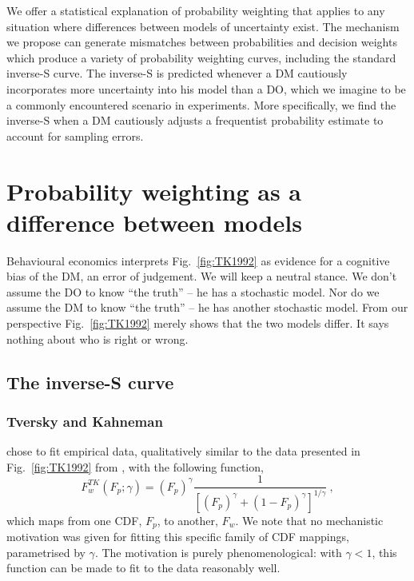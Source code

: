 \documentclass[a4paper, 12pt]{article}
\newcommand{\elabel}[1]{\label{eq:#1}}
\newcommand{\eref}[1]{(Eq.~\ref{eq:#1})}
\newcommand{\fref}[1]{Fig.~\ref{fig:#1}}
\newcommand{\seclabel}[1]{\label{sec:#1}}
\newcommand{\be}{\begin{equation}}
\newcommand{\ee}{\end{equation}}
\newcommand{\MK}[1]{\textcolor{red}{\textit{***MK: #1 MK***}}}
\begin{document}
We offer a statistical explanation of probability weighting that applies to any situation where differences between models of uncertainty exist.
The mechanism we propose can generate mismatches between probabilities and decision weights which produce a variety of probability weighting curves, including the standard inverse-S curve.
The inverse-S is predicted whenever a DM cautiously incorporates more uncertainty into his model than a DO, which we imagine to be a commonly encountered scenario in experiments.
More specifically, we find the inverse-S when a DM cautiously adjusts a frequentist probability estimate to account for sampling errors.
%
% 
%



\section{Probability weighting as a difference between models} \seclabel{ModelDiff}
Behavioural economics interprets \fref{TK1992} as evidence for a cognitive bias of the DM, an error of judgement. We will keep a neutral stance. We don't assume the DO to know ``the truth'' -- he has a stochastic model. Nor do we assume the DM to know ``the truth'' -- he has another stochastic model. From our perspective \fref{TK1992} merely shows that the two models differ. It says nothing about who is right or wrong.

\subsection{The inverse-S curve\seclabel{The_inverse}}
\subsubsection{Tversky and Kahneman}
\textcite{TverskyKahneman1992} chose to fit empirical data, qualitatively similar to the data presented in \fref{TK1992} from \textcite{PrestonBaratta1948}, with the following function,
%
\be
\elabel{correspondence}
F^{TK}_w\left(F_p; \gamma\right) = \left(F_p\right)^\gamma \frac{1}{\left[\left(F_p\right)^\gamma+\left(1-F_p\right)^\gamma\right]^{1/\gamma}} ~,
\ee
%
which maps from one CDF, $F_p$, to another, $F_w$. We note that no mechanistic motivation was given for fitting this specific family of CDF mappings, parametrised by $\gamma$. The motivation is purely phenomenological: with $\gamma<1$, this function can be made to fit to the data reasonably well.
\end{document}
